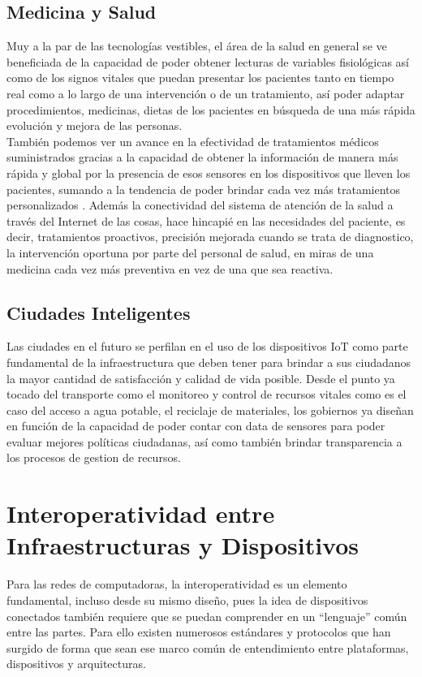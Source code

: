 \subsection{Medicina y Salud}
Muy a la par de las tecnologías vestibles, el área de la salud en general se ve beneficiada de la capacidad de poder obtener lecturas de variables fisiológicas así como de los signos vitales que puedan presentar los pacientes  tanto en tiempo real como a lo largo de una intervención o de un tratamiento, así poder adaptar procedimientos, medicinas, dietas de los pacientes en búsqueda de una más rápida evolución y mejora de las personas.\\

También podemos ver un avance en la efectividad de tratamientos médicos suministrados gracias a la capacidad de obtener la información de manera más rápida y global por la presencia de esos sensores en los dispositivos que lleven los pacientes, sumando a la tendencia de poder brindar cada vez más tratamientos personalizados \cite{ibmiotmedicina}. Además la conectividad del sistema de atención de la salud a través del Internet de las cosas, hace hincapié en las necesidades del paciente, es decir, tratamientos proactivos, precisión mejorada cuando se trata de diagnostico, la intervención oportuna por parte del personal de salud, en miras de una medicina cada vez más preventiva en vez de una que sea reactiva. 

\subsection{Ciudades Inteligentes}
Las ciudades en el futuro se perfilan en el uso de los dispositivos IoT como parte fundamental de la infraestructura que deben tener para brindar a sus ciudadanos la mayor cantidad de satisfacción y calidad de vida posible. Desde el punto ya tocado del transporte como el monitoreo y control de recursos vitales como es el caso del acceso a agua potable, el reciclaje de materiales, los gobiernos ya diseñan en función de la capacidad de poder contar con data de sensores para poder evaluar mejores políticas ciudadanas, así como también brindar transparencia a los procesos de gestion de recursos\cite{ibmiotciudad}. 

\section{Interoperatividad entre Infraestructuras y Dispositivos}
Para las redes de computadoras, la interoperatividad es un elemento fundamental, incluso desde su mismo diseño, pues la idea de dispositivos conectados también requiere que se puedan comprender en un ``lenguaje'' común entre las partes. Para ello existen numerosos estándares y protocolos que han surgido de forma que sean ese marco común de entendimiento entre plataformas, dispositivos y arquitecturas.\\

